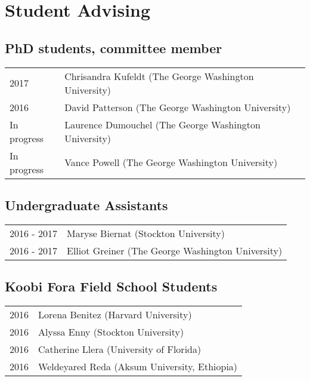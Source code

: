 \documentclass{article}
\begin{document}
\section*{Student Advising}
\subsection*{PhD students, committee member}
\begin{tabular}{p{}p{}}
2017 & Chrisandra Kufeldt (The George Washington University)\\[4pt]
2016 & David Patterson (The George Washington University)\\[4pt]
In progress & Laurence Dumouchel (The George Washington University)\\[4pt]
In progress & Vance Powell (The George Washington University)\\
\end{tabular}

\subsection*{Undergraduate Assistants}
\begin{tabular}{p{}p{}}
2016 - 2017 & Maryse Biernat (Stockton University)\\[4pt]
2016 - 2017 & Elliot Greiner (The George Washington University)\\
\end{tabular}

\subsection*{Koobi Fora Field School Students}
\begin{tabular}{p{}p{}}
2016 & Lorena Benitez (Harvard University)\\[4pt]
2016 & Alyssa Enny (Stockton University)\\[4pt]
2016 & Catherine Llera (University of Florida)\\[4pt]
2016 & Weldeyared Reda (Aksum University, Ethiopia)\\
\end{tabular}

\pagebreak
\end{document}
